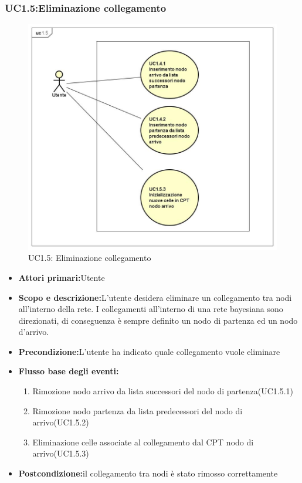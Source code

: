 \subsubsection{UC1.5:Eliminazione collegamento}
\begin{figure} [H]
	\centering
	\includegraphics[scale=0.45]{Img/UC1-5}
	\caption{UC1.5: Eliminazione collegamento}\label{}
\end{figure}
\begin{itemize}
	\item{\textbf{Attori primari:}Utente}
	\item{\textbf{Scopo e descrizione:}L'utente desidera eliminare un collegamento tra nodi all'interno della rete. I collegamenti all'interno di una rete bayesiana sono direzionati, di conseguenza è sempre definito un nodo di partenza ed un nodo d'arrivo.}
	\item{\textbf{Precondizione:}L'utente ha indicato quale collegamento vuole eliminare}
	\item{\textbf{Flusso base degli eventi:}}
		\begin{enumerate}
			\item{Rimozione nodo arrivo da lista successori del nodo di partenza(UC1.5.1)}
			\item{Rimozione nodo partenza da lista predecessori del nodo di arrivo(UC1.5.2)}
			\item{Eliminazione celle associate al collegamento dal CPT nodo di arrivo(UC1.5.3)}
		\end{enumerate}
	\item{\textbf{Postcondizione:}il collegamento tra nodi è stato rimosso correttamente}
\end{itemize}
